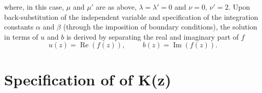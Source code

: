 %
where, in this case, $\mu$ and $\mu'$ are as above, $\lambda=\lambda'=0$ and $\nu=0$, $\nu'=2$.
%
Upon back-substitution of the independent variable and specification of the integration constants $\alpha$ and $\beta$ (through the imposition of boundary conditions), the solution in terms of $u$ and $b$ is derived by separating the real and imaginary part of $f$
%
\begin{equation}
	u(z) = \operatorname{Re}(f(z)), \hspace{1cm} b(z) = \operatorname{Im}(f(z)).
\end{equation}



\section{Specification of of K(z)}

